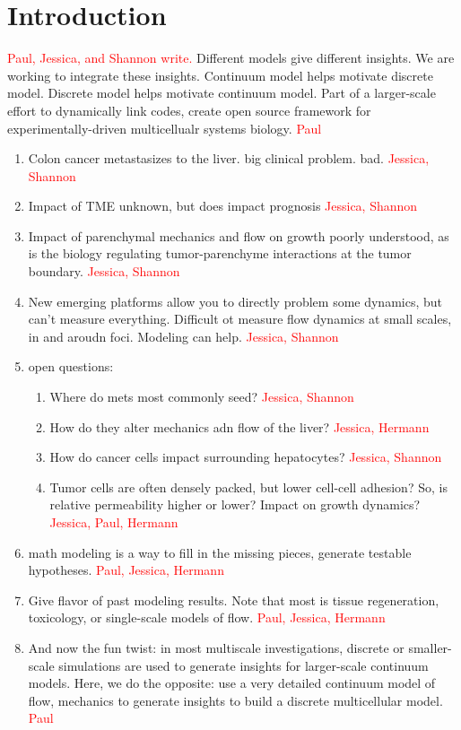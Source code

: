 \documentclass[smallextended,natbib]{svjour3}
\newcommand{\red}[1]{\textcolor{red}{#1}}
\begin{document}
\section{Introduction}
\red{Paul, Jessica, and Shannon write.}
Different models give different insights. We are working to integrate these insights. 
Continuum model helps motivate discrete model. 
Discrete model helps motivate continuum model. 
Part of a larger-scale effort to dynamically link codes, create open source framework 
for experimentally-driven multicellualr systems biology.  \red{Paul}

\begin{enumerate}
\item 
Colon cancer metastasizes to the liver. big clinical problem. bad.  \red{Jessica, Shannon}
\item 
Impact of TME unknown, but does impact prognosis \red{Jessica, Shannon}
\item 
Impact of parenchymal mechanics and flow on growth poorly understood, as is the biology regulating tumor-parenchyme interactions 
at the tumor boundary. \red{Jessica, Shannon}
\item 
New emerging platforms allow you to directly problem some dynamics, but can't measure everything. Difficult ot measure flow dynamics at 
small scales, in and aroudn foci. Modeling can help.  \red{Jessica, Shannon}
\item 
open questions: 
\begin{enumerate}
\item 
Where do mets most commonly seed? \red{Jessica, Shannon}
\item
How do they alter mechanics adn flow of the liver? \red{Jessica, Hermann}
\item 
How do cancer cells impact surrounding hepatocytes? \red{Jessica, Shannon}
\item 
Tumor cells are often densely packed, but lower cell-cell adhesion? So, is relative permeability higher or lower? Impact on growth 
dynamics? \red{Jessica, Paul, Hermann}
\end{enumerate}
\item 
math modeling is a way to fill in the missing pieces, generate testable hypotheses. \red{Paul, Jessica, Hermann}
\item 
Give flavor of past modeling results. Note that most is tissue regeneration, toxicology, or single-scale models of flow.  
\red{Paul, Jessica, Hermann}
\item 
And now the fun twist: in most multiscale investigations, discrete or smaller-scale simulations are used to generate insights for 
larger-scale continuum models. Here, we do the opposite: use a very detailed continuum model of flow, mechanics to generate insights 
to build a discrete multicellular model. \red{Paul}
\end{enumerate}
\end{document}
